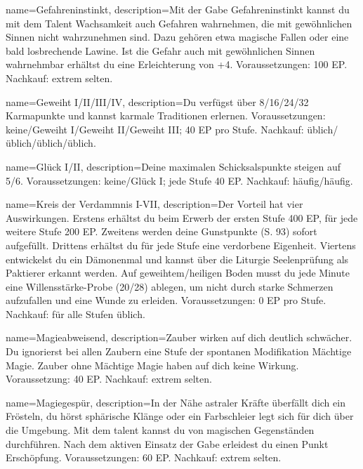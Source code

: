 {
    name={Gefahreninstinkt},
    description={Mit der Gabe Gefahreninstinkt kannst du mit dem Talent Wachsamkeit auch Gefahren wahrnehmen, die mit gewöhnlichen Sinnen nicht wahrzunehmen sind. Dazu gehören etwa magische Fallen oder eine bald losbrechende Lawine. Ist die Gefahr auch mit gewöhnlichen Sinnen wahrnehmbar erhältst du eine Erleichterung von +4. Voraussetzungen: 100 EP. Nachkauf: extrem selten.}}

{
    name={Geweiht I/II/III/IV},
    description={Du verfügst über 8/16/24/32 Karmapunkte und kannst karmale Traditionen erlernen. Voraussetzungen: keine/Geweiht I/Geweiht II/Geweiht III; 40 EP pro Stufe. Nachkauf: üblich/üblich/üblich/üblich.}}

{
    name={Glück I/II},
    description={Deine maximalen Schicksalspunkte steigen auf 5/6. Voraussetzungen: keine/Glück I; jede Stufe 40 EP. Nachkauf: häufig/häufig.}}

{
    name={Kreis der Verdammnis I-VII},
    description={Der Vorteil hat vier Auswirkungen. Erstens erhältst du beim Erwerb der ersten Stufe 400 EP, für jede weitere Stufe 200 EP. Zweitens werden deine Gunstpunkte (S. 93) sofort aufgefüllt. Drittens erhältst du für jede Stufe eine verdorbene Eigenheit. Viertens entwickelst du ein Dämonenmal und kannst über die Liturgie Seelenprüfung als Paktierer erkannt werden. Auf geweihtem/heiligen Boden musst du jede Minute eine Willensstärke-Probe (20/28) ablegen, um nicht durch starke Schmerzen aufzufallen und eine Wunde zu erleiden. Voraussetzungen: 0 EP pro Stufe. Nachkauf: für alle Stufen üblich.}}

{
    name={Magieabweisend},
    description={Zauber wirken auf dich deutlich schwächer. Du ignorierst bei allen Zaubern eine Stufe der spontanen Modifikation Mächtige Magie. Zauber ohne Mächtige Magie haben auf dich keine Wirkung. Voraussetzung: 40 EP. Nachkauf: extrem selten.}}

{
    name={Magiegespür},
    description={In der Nähe astraler Kräfte überfällt dich ein Frösteln, du hörst sphärische Klänge oder ein Farbschleier legt sich für dich über die Umgebung. Mit dem \gls{talent}  kannst du  von magischen Gegenständen durchführen. Nach dem aktiven Einsatz der Gabe erleidest du einen Punkt Erschöpfung. Voraussetzungen: 60 EP. Nachkauf: extrem selten.}}


